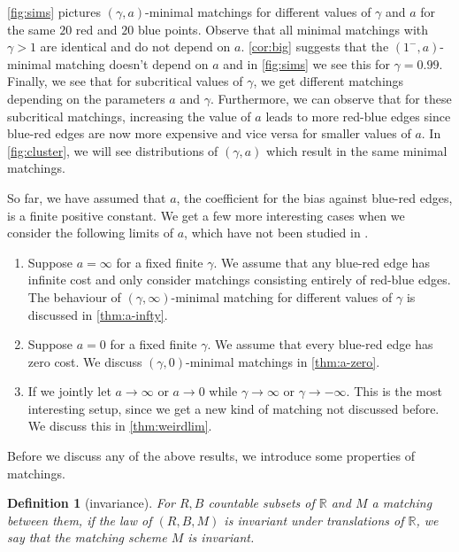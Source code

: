 \documentclass{article}
\newtheorem{definition}{Definition}
\begin{document}
 \cref{fig:sims} pictures $(\gamma,a)$-minimal
matchings for different values of $\gamma$ and $a$ for the same $20$ red
and $20$ blue points. Observe that all
minimal matchings with
$\gamma>1$ are identical and do not depend on $a$. \cref{cor:big}
suggests that the $(1^-,a)$-minimal matching doesn't
depend on $a$ and in \cref{fig:sims} we see this for $\gamma=0.99$.
Finally, we see that for subcritical values of $\gamma$, we get
different matchings depending on the parameters $a$ and $\gamma$.
Furthermore, we can observe that for these subcritical matchings,
increasing the value of $a$ leads to more red-blue edges since
blue-red edges are now more expensive and vice versa for smaller
values of $a$. In \cref{fig:cluster}, we will see distributions of
$(\gamma,a)$ which result in the same minimal matchings.



So far, we have assumed that $a$, the coefficient for the bias against
blue-red edges, is a finite positive constant. We get a few more interesting cases when we
consider the following limits of $a$, which have not been studied in
\cite{minimal}.

\begin{enumerate}
\item Suppose $a=\infty$ for a fixed finite $\gamma$. We assume that any blue-red edge has infinite cost and only
  consider matchings consisting entirely of red-blue edges. The
  behaviour of $(\gamma,\infty)$-minimal matching for different values of $\gamma$ is discussed in
  \cref{thm:a-infty}.
  \item Suppose $a=0$ for a fixed finite $\gamma$. We assume that every blue-red edge has
    zero cost. We discuss $(\gamma,0)$-minimal matchings in  \cref{thm:a-zero}.
    \item If we jointly let $a\rightarrow\infty$ or $a\rightarrow 0$ while
     $\gamma\rightarrow\infty$ or $\gamma\rightarrow-\infty$. This is the most interesting setup,
    since we get a new kind of matching not discussed before. We
     discuss this in \cref{thm:weirdlim}.
  \end{enumerate}

  Before we discuss any of the above results, we introduce some
  properties of matchings.


\begin{definition}[invariance]
  For $R,B$ countable subsets of $\mathbb{R}$ and $M$ a matching
  between them, if the law of $(R,B,M)$ is invariant under
  translations of $\mathbb{R}$, we say that the matching scheme $M$ is
  invariant.
\end{definition}
\end{document}
